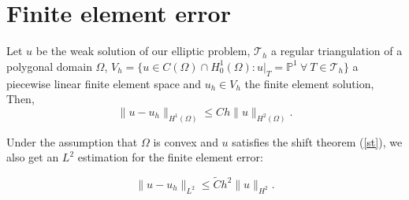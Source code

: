 \documentclass[pagesize]{scrartcl}
\begin{document}





\section{Finite element error}
Let $u$ be the weak solution of our elliptic problem, $\mathcal{T}_h$ a regular triangulation of a polygonal domain $\Omega$, $V_h = \{u \in C(\Omega) \cap H_0^1(\Omega): u|_T = \mathbb{P}^1 \ \forall\ T \in \mathcal{T}_h \}$ a piecewise linear finite element space and $u_h \in V_h$ the finite element solution,
Then,
\begin{equation*}
	\|u - u_h\|_{H^1(\Omega)} \leq C h \|u\|_{H^2(\Omega)}. \label{fee}
\end{equation*}


Under the assumption that $\Omega$ is convex and $u$ satisfies the shift theorem (\ref{st}), we also get an $L^2$ estimation for the finite element error:






\begin{equation*}
	\|u-u_h\|_{L^2} \leq \tilde{C}h^2 \|u\|_{H^2}.
\end{equation*}\\[0.5ex]
\end{document}

